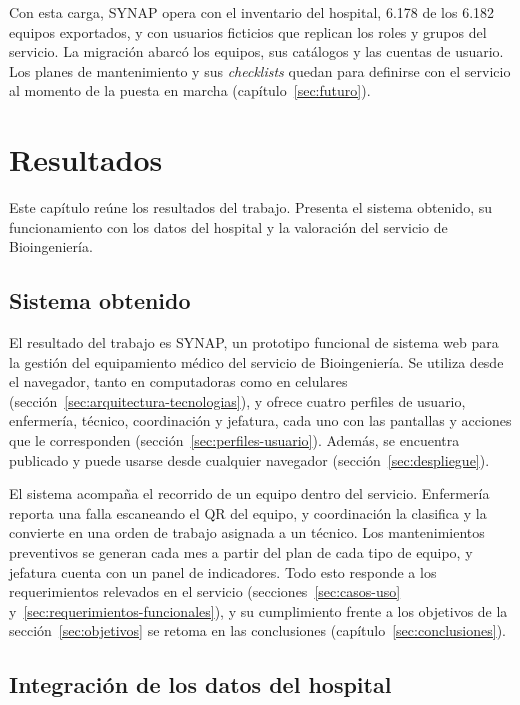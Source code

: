 \documentclass[10pt]{article}
\begin{document}
Con esta carga, SYNAP opera con el inventario del hospital, 6.178 de los 6.182 equipos exportados, y con usuarios ficticios que replican los roles y grupos del servicio. La migración abarcó los equipos, sus catálogos y las cuentas de usuario. Los planes de mantenimiento y sus \textit{checklists} quedan para definirse con el servicio al momento de la puesta en marcha (capítulo~\ref{sec:futuro}). 

\newpage
\section{Resultados}
\label{sec:resultados}

Este capítulo reúne los resultados del trabajo. Presenta el sistema obtenido, su funcionamiento con los datos del hospital y la valoración del servicio de Bioingeniería.

\subsection{Sistema obtenido}
\label{sec:sistema-obtenido}

El resultado del trabajo es SYNAP, un prototipo funcional de sistema web para la gestión del equipamiento médico del servicio de Bioingeniería. Se utiliza desde el navegador, tanto en computadoras como en celulares (sección~\ref{sec:arquitectura-tecnologias}), y ofrece cuatro perfiles de usuario, enfermería, técnico, coordinación y jefatura, cada uno con las pantallas y acciones que le corresponden (sección~\ref{sec:perfiles-usuario}). Además, se encuentra publicado y puede usarse desde cualquier navegador (sección~\ref{sec:despliegue}).

El sistema acompaña el recorrido de un equipo dentro del servicio. Enfermería reporta una falla escaneando el QR del equipo, y coordinación la clasifica y la convierte en una orden de trabajo asignada a un técnico. Los mantenimientos preventivos se generan cada mes a partir del plan de cada tipo de equipo, y jefatura cuenta con un panel de indicadores. Todo esto responde a los requerimientos relevados en el servicio (secciones~\ref{sec:casos-uso} y~\ref{sec:requerimientos-funcionales}), y su cumplimiento frente a los objetivos de la sección~\ref{sec:objetivos} se retoma en las conclusiones (capítulo~\ref{sec:conclusiones}).

\subsection{Integración de los datos del hospital}
\label{sec:integracion-resultados}
\end{document}
